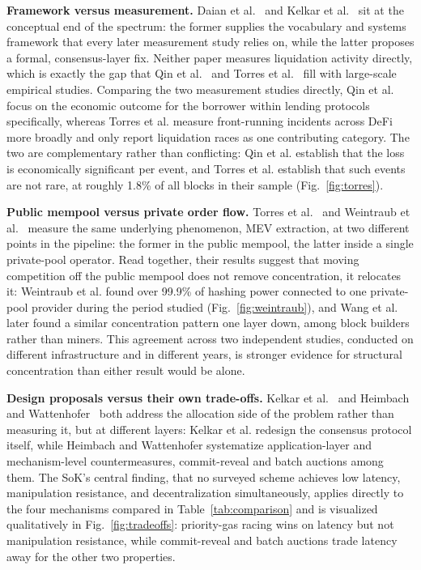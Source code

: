 \documentclass{llncs}
\begin{document}
\textbf{Framework versus measurement.} Daian et al.~\cite{daian2019flash}
and Kelkar et al.~\cite{kelkar2020order} sit at the conceptual end of the
spectrum: the former supplies the vocabulary and systems framework that
every later measurement study relies on, while the latter proposes a
formal, consensus-layer fix. Neither paper measures liquidation activity
directly, which is exactly the gap that Qin et al.~\cite{qin2021empirical}
and Torres et al.~\cite{torres2021frontrunner} fill with large-scale
empirical studies. Comparing the two measurement studies directly,
Qin et al. focus on the economic outcome for the borrower within
lending protocols specifically, whereas Torres et al. measure
front-running incidents across DeFi more broadly and only report
liquidation races as one contributing category. The two are
complementary rather than conflicting: Qin et al. establish that the
loss is economically significant per event, and Torres et al. establish
that such events are not rare, at roughly 1.8\% of all blocks in their
sample (Fig.~\ref{fig:torres}).

\textbf{Public mempool versus private order flow.} Torres et
al.~\cite{torres2021frontrunner} and Weintraub et
al.~\cite{weintraub2022flashbot} measure the same underlying phenomenon,
MEV extraction, at two different points in the pipeline: the former in
the public mempool, the latter inside a single private-pool operator.
Read together, their results suggest that moving competition off the
public mempool does not remove concentration, it relocates it: Weintraub
et al. found over 99.9\% of hashing power connected to one private-pool
provider during the period studied (Fig.~\ref{fig:weintraub}), and
Wang et al.~\cite{wang2024private} later found a similar concentration
pattern one layer down, among block builders rather than miners. This
agreement across two independent studies, conducted on different
infrastructure and in different years, is stronger evidence for
structural concentration than either result would be alone.

\textbf{Design proposals versus their own trade-offs.} Kelkar et
al.~\cite{kelkar2020order} and Heimbach and
Wattenhofer~\cite{heimbach2022sok} both address the allocation side of
the problem rather than measuring it, but at different layers: Kelkar et
al. redesign the consensus protocol itself, while Heimbach and
Wattenhofer systematize application-layer and mechanism-level
countermeasures, commit-reveal and batch auctions among them. The SoK's
central finding, that no surveyed scheme achieves low latency,
manipulation resistance, and decentralization simultaneously, applies
directly to the four mechanisms compared in Table~\ref{tab:comparison}
and is visualized qualitatively in Fig.~\ref{fig:tradeoffs}: priority-gas
racing wins on latency but not manipulation resistance, while
commit-reveal and batch auctions trade latency away for the other two
properties.
\end{document}
